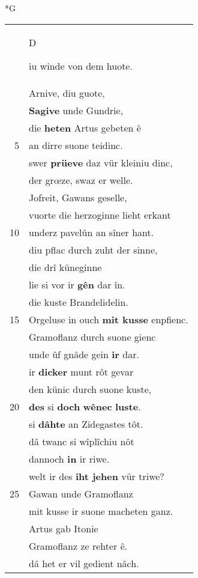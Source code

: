 \documentclass[8pt,a4paper,notitlepage]{article}
\begin{document}
\begin{table}[ht]
\begin{minipage}[t]{0.5\linewidth}
\small
\begin{center}*G
\end{center}
\begin{tabular}{rl}
 & \begin{large}D\end{large}iu winde von dem huote.\\ 
 & Arnive, diu guote,\\ 
 & \textbf{Sagive} unde Gundrie,\\ 
 & die \textbf{heten} Artus gebeten ê\\ 
5 & an dirre suone teidinc.\\ 
 & swer \textbf{prüeve} daz vür kleiniu dinc,\\ 
 & der grœze, swaz er welle.\\ 
 & Jofreit, Gawans geselle,\\ 
 & vuorte die herzoginne lieht erkant\\ 
10 & underz pavelûn an sîner hant.\\ 
 & diu pflac durch zuht der sinne,\\ 
 & die drî küneginne\\ 
 & lie si vor ir \textbf{gên} dar în.\\ 
 & die kuste Brandelidelin.\\ 
15 & Orgeluse in ouch \textbf{mit kusse} enpfienc.\\ 
 & Gramoflanz durch suone gienc\\ 
 & unde ûf gnâde gein \textbf{ir} dar.\\ 
 & ir \textbf{dicker} munt rôt gevar\\ 
 & den künic durch suone kuste,\\ 
20 & \textbf{des} si \textbf{doch} \textbf{wênec} \textbf{luste}.\\ 
 & si \textbf{dâhte} an Zidegastes tôt.\\ 
 & dâ twanc si wîplîchiu nôt\\ 
 & dannoch \textbf{in} ir riwe.\\ 
 & welt ir des \textbf{iht jehen} vür triwe?\\ 
25 & Gawan unde Gramoflanz\\ 
 & mit kusse ir suone macheten ganz.\\ 
 & Artus gab Itonie\\ 
 & Gramoflanz ze rehter ê.\\ 
 & dâ het er vil gedient nâch.\\ 

\end{tabular}
\end{minipage}
\end{table}
\end{document}
